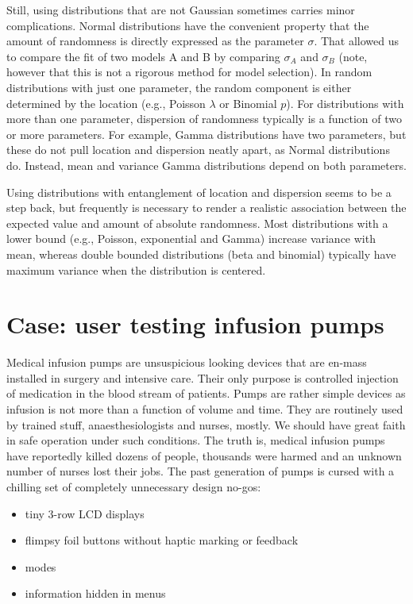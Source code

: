 \documentclass[]{svmono}
\providecommand{\tightlist}{%
  \setlength{\itemsep}{0pt}\setlength{\parskip}{0pt}}
\theoremstyle{definition}
\theoremstyle{definition}
\theoremstyle{definition}
\theoremstyle{remark}
\begin{document}
Still, using distributions that are not Gaussian sometimes carries minor
complications. Normal distributions have the convenient property that
the amount of randomness is directly expressed as the parameter
\(\sigma\). That allowed us to compare the fit of two models A and B by
comparing \(\sigma_A\) and \(\sigma_B\) (note, however that this is not
a rigorous method for model selection). In random distributions with
just one parameter, the random component is either determined by the
location (e.g., Poisson \(\lambda\) or Binomial \(p\)). For
distributions with more than one parameter, dispersion of randomness
typically is a function of two or more parameters. For example, Gamma
distributions have two parameters, but these do not pull location and
dispersion neatly apart, as Normal distributions do. Instead, mean and
variance Gamma distributions depend on both parameters.

Using distributions with entanglement of location and dispersion seems
to be a step back, but frequently is necessary to render a realistic
association between the expected value and amount of absolute
randomness. Most distributions with a lower bound (e.g., Poisson,
exponential and Gamma) increase variance with mean, whereas double
bounded distributions (beta and binomial) typically have maximum
variance when the distribution is centered.

\section{Case: user testing infusion
pumps}\label{case-user-testing-infusion-pumps}

Medical infusion pumps are unsuspicious looking devices that are en-mass
installed in surgery and intensive care. Their only purpose is
controlled injection of medication in the blood stream of patients.
Pumps are rather simple devices as infusion is not more than a function
of volume and time. They are routinely used by trained stuff,
anaesthesiologists and nurses, mostly. We should have great faith in
safe operation under such conditions. The truth is, medical infusion
pumps have reportedly killed dozens of people, thousands were harmed and
an unknown number of nurses lost their jobs. The past generation of
pumps is cursed with a chilling set of completely unnecessary design
no-gos:

\begin{itemize}
\tightlist
\item
  tiny 3-row LCD displays
\item
  flimpsy foil buttons without haptic marking or feedback
\item
  modes
\item
  information hidden in menus
\end{itemize}
\end{document}
